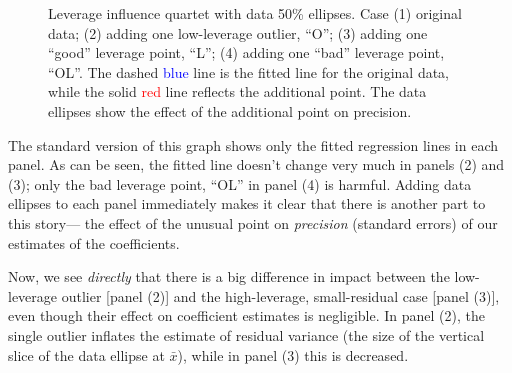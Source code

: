 \documentclass[
  letterpaper,
  10pt,
  krantz2]{krantz}
\begin{document}
\begin{figure}[H]


\caption{\label{fig-levdemo}Leverage influence quartet with data 50\%
ellipses. Case (1) original data; (2) adding one low-leverage outlier,
``O''; (3) adding one ``good'' leverage point, ``L''; (4) adding one
``bad'' leverage point, ``OL''. The dashed \textcolor{blue}{blue} line
is the fitted line for the original data, while the solid
\textcolor{red}{red} line reflects the additional point. The data
ellipses show the effect of the additional point on precision.}

\end{figure}%

The standard version of this graph shows only the fitted regression
lines in each panel. As can be seen, the fitted line doesn't change very
much in panels (2) and (3); only the bad leverage point, ``OL'' in panel
(4) is harmful. Adding data ellipses to each panel immediately makes it
clear that there is another part to this story--- the effect of the
unusual point on \emph{precision} (standard errors) of our estimates of
the coefficients.

Now, we see \emph{directly} that there is a big difference in impact
between the low-leverage outlier {[}panel (2){]} and the high-leverage,
small-residual case {[}panel (3){]}, even though their effect on
coefficient estimates is negligible. In panel (2), the single outlier
inflates the estimate of residual variance (the size of the vertical
slice of the data ellipse at \(\bar{x}\)), while in panel (3) this is
decreased.
\end{document}
